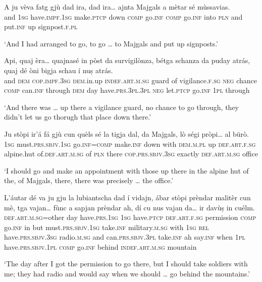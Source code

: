 \begin{linenumbers}
\gll A ju vèva fatg gjù dad ira, dad ira… ajnta Majgals a mètar sé mùssavias.   \\
and \textsc{1sg} have.\textsc{impf.1sg} make.\textsc{ptcp} down \textsc{comp}  go.\textsc{inf} \textsc{comp} go.\textsc{inf} into \textsc{pln} and put.\textsc{inf} up signpost.\textsc{f.pl} \\
\end{linenumbers}
\medskip
\glt `And I had arranged to go, to go … to Majgals and put up signposts.'
\medskip

\begin{linenumbers}
\gll  Api, quaj èra… quajnasé in pòst da survigilònza, bétga schanza da puday atrás, quaj dé òni bigja schau í nuṣ atrás.  \\
and \textsc{dem} \textsc{cop.impf.3sg} \textsc{dem.}in.up \textsc{indef.art.m.sg} guard of vigilance.\textsc{f.sg} \textsc{neg} chance \textsc{comp} can.\textsc{inf} through \textsc{dem} day have.\textsc{prs.3pl.3pl} \textsc{neg} let.\textsc{ptcp} go.\textsc{inf} \textsc{1pl} through  \\
\end{linenumbers}
\medskip
\glt `And there was … up there a vigilance guard, no chance to go through, they didn’t let us go thorugh that place down there.'
\medskip

\begin{linenumbers}
\gll Ju stòpi ir’á fá gjù cun quèls sé la tigja dal, da Majgals, lò ségi pròpi… al bürò.   \\
 \textsc{1sg} must.\textsc{prs.sbjv.1sg} go.\textsc{inf}=\textsc{comp} make.\textsc{inf} down with \textsc{dem.m.pl} up \textsc{def.art.f.sg} alpine.hut of.\textsc{def.art.m.sg} of \textsc{pln} there \textsc{cop.prs.sbjv.3sg} exactly  \textsc{def.art.m.sg} office\\
\end{linenumbers}
\medskip
\glt `I should go and make an appointment with those up there in the alpine hut of the, of Majgals, there, there was precisely … the office.'
\medskip

\begin{linenumbers}
\gll  L’áutar dé va ju gju la lubiantscha dad í vidajn, ábar stòpi prèndar malitèr cun mè, tga vajan… fùnc a sapjan prèndar ah, dí cu nus vajan da… ir davùṣ in cuélm.  \\
 \textsc{def.art.m.sg}=other day have.\textsc{prs.1sg} \textsc{1sg} have.\textsc{ptcp} \textsc{def.art.f.sg} permission \textsc{comp} go.\textsc{inf} in but must.\textsc{prs.sbjv.1sg}  take.\textsc{inf} military.\textsc{m.sg} with \textsc{1sg} \textsc{rel} have.\textsc{prs.sbjv.3sg} radio.\textsc{m.sg} and can.\textsc{prs.sbjv.3pl} take.\textsc{inf} ah say.\textsc{inf} when \textsc{1pl} have.\textsc{prs.sbjv.1pl} \textsc{comp} go.\textsc{inf} behind \textsc{indef.art.m.sg} mountain\\
\end{linenumbers}
\medskip
\glt `The day after I got the permission to go there, but I should take soldiers with me; they had radio and would say when we should … go behind the mountains.'
\medskip

